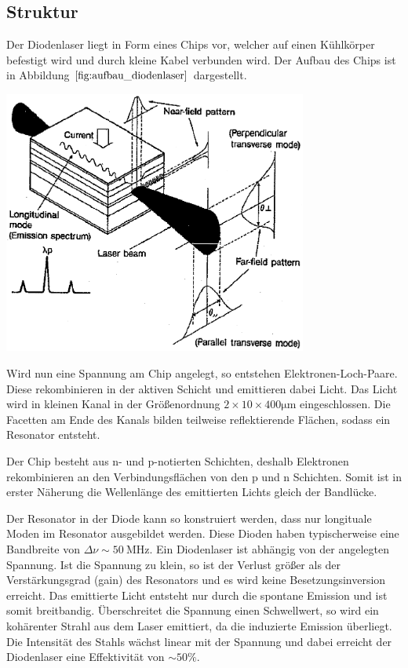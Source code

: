 \documentclass[captions=tableheading]{scrartcl}
\begin{document}
\subsection{Struktur}
Der Diodenlaser liegt in Form eines Chips vor, welcher auf einen Kühlkörper befestigt wird und durch kleine Kabel verbunden wird. Der Aufbau des Chips ist in Abbildung $\ref{fig:aufbau_diodenlaser}$ dargestellt. 
\begin{center}
	\includegraphics[width=10cm]{images/aufbau_diodenlaser.png}
	\label{fig:aufbau_diodenlaser}
\end{center}
Wird nun eine Spannung am Chip angelegt, so entstehen Elektronen-Loch-Paare.
Diese rekombinieren in der aktiven Schicht und emittieren dabei Licht.
Das Licht wird in kleinen Kanal in der Größenordnung $2\times 10 \times 400\si{\micro\meter}$  eingeschlossen. 
Die Facetten am Ende des Kanals bilden teilweise reflektierende Flächen, sodass ein Resonator entsteht.

Der Chip besteht aus n- und p-notierten Schichten, deshalb Elektronen rekombinieren an den Verbindungsflächen von den p und n Schichten. 
Somit ist in erster Näherung die Wellenlänge des emittierten Lichts gleich der Bandlücke.

Der Resonator in der Diode kann so konstruiert werden, dass nur longituale Moden im Resonator ausgebildet werden. 
Diese Dioden haben typischerweise eine Bandbreite von $\Delta \nu \sim \SI{50}{\mega\hertz}$.
\newpage
Ein Diodenlaser ist abhängig von der angelegten Spannung. Ist die Spannung zu klein, so ist der Verlust größer als der Verstärkungsgrad (gain) des Resonators und es wird keine Besetzungsinversion erreicht. Das emittierte Licht entsteht nur durch die spontane Emission und ist somit breitbandig.
Überschreitet die Spannung einen Schwellwert, so wird ein kohärenter Strahl aus dem Laser emittiert, da die induzierte Emission überliegt. 
Die Intensität des Stahls wächst linear mit der Spannung und dabei erreicht der Diodenlaser eine Effektivität von $\sim 50\%$.
\end{document}
